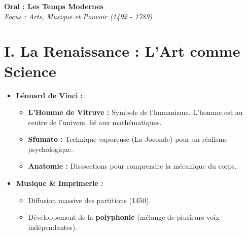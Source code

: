 \documentclass[12pt]{article}
\begin{document}
\begin{center}
    \Huge \textbf{\textcolor{mainblue}{Oral : Les Temps Modernes}} \\
    \large \textit{Focus : Arts, Musique et Pouvoir (1492 - 1789)}
\end{center}

\vspace{0.8cm}

\section*{\textcolor{mainblue}{I. La Renaissance : L'Art comme Science}}
\begin{itemize}[label=\textcolor{mainblue}{$\bullet$}]
    \item \textbf{\textcolor{importantred}{Léonard de Vinci :}} 
        \begin{itemize}[label=--]
            \item \textbf{L'Homme de Vitruve :} Symbole de l'humanisme. L'homme est au centre de l'univers, lié aux mathématiques.
            \item \textbf{Sfumato :} Technique vaporeuse (La Joconde) pour un réalisme psychologique.
            \item \textbf{Anatomie :} Disssections pour comprendre la mécanique du corps.
        \end{itemize}
    \item \textbf{\textcolor{importantred}{Musique & Imprimerie :}} 
        \begin{itemize}[label=--]
            \item Diffusion massive des partitions (1450).
            \item Développement de la \textbf{polyphonie} (mélange de plusieurs voix indépendantes).
        \end{itemize}
\end{itemize}

\vspace{0.5cm}
\end{document}

